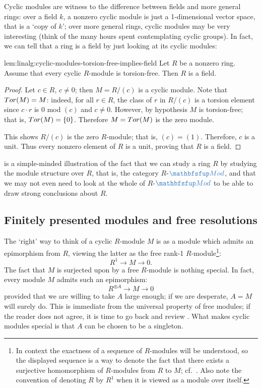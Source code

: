 Cyclic modules are witness to the difference between fields and more
general rings: over a field $k$, a nonzero cyclic module is just a
1-dimensional vector space, that is a `copy of $k$'; over more general
rings, cyclic modules may be very interesting (think of the many hours
spent contemplating cyclic groups). In fact, we can tell that a ring
is a field by just looking at its cyclic modules:
\begin{lem}{}{lem:linalg:cyclic-modules-torsion-free-implies-field}
  Let $R$ be a nonzero ring. Assume that every cyclic $R$-module
  is torsion-free. Then $R$ is a field.
\end{lem}
\begin{proof}
  Let $c \in R$, $c \neq 0$; then $M = R/(c)$ is a cyclic module. Note
  that $Tor(M) = M$: indeed, for all $r \in R$, the class of $r$ in
  $R/(c)$ is a torsion element since $c \cdot r$ is $0$ mod $(c)$ and
  $c \neq 0$. However, by hypothesis $M$ is torsion-free; that is,
  $Tor(M) = \{0\}$. Therefore $M = Tor(M)$ is the zero module.

  This shows $R/(c)$ is the zero $R$-module; that is, $(c) = (1)$.
  Therefore, $c$ is a unit. Thus every nonzero element of $R$ is a
  unit, proving that $R$ is a field.
\end{proof}

 is a simple-minded illustration of the fact that we
can study a ring $R$ by studying the module structure over $R$, that
is, the category $R$-$\categ{Mod}$, and that we may not even need to
look at the whole of $R$-$\categ{Mod}$ to be able to draw strong
conclusions about $R$.

\subsection{Finitely presented modules and free resolutions}
\label{subsec:linalg:finitely-presented-modules-and-free-resolutions}
The `right' way to think of a cyclic $R$-module $M$ is as a module
which admits an epimorphism from $R$, viewing the latter as the free
rank-1 $R$-module\footnote{In context the exactness of a sequence of
  $R$-modules will be understood, so the displayed sequence is a way
  to denote the fact that there exists a surjective homomorphism of
  $R$-modules from $R$ to $M$; cf.\
  . Also note the convention
  of denoting $R$ by $R^1$ when it is viewed as a module over
  itself.}:
\[
  R^1 \to M \to 0.
\]
The fact that $M$ is surjected upon by a free $R$-module is nothing
special. In fact, every module $M$ admits such an epimorphism:
\[
  R^{\oplus A} \to M \to 0
\]
provided that we are willing to take $A$ large enough; if we are
desperate, $A = M$ will surely do. This is immediate from the
universal property of free modules; if the reader does not agree, it
is time to go back and review
. What makes
cyclic modules special is that $A$ can be chosen to be a singleton.

